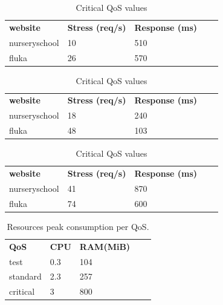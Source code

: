 \begin{table}[!htb]
\centering

\begin{tabular}{|l|ll|ll}
\cline{1-3}
\textbf{website} & \multicolumn{1}{l|}{\textbf{Stress (req/s)}} & \textbf{Response (ms)} &  &  \\ \cline{1-3}
nurseryschool    & 10                                           & 510                    &  &  \\ \cline{1-1}
fluka            & 26                                           & 570                    &  &  \\ \cline{1-3}
\end{tabular}
\caption{Test QoS Values}


\begin{tabular}{|l|ll|ll}
\cline{1-3}
\textbf{website} & \multicolumn{1}{l|}{\textbf{Stress (req/s)}} & \textbf{Response (ms)} &  &  \\ \cline{1-3}
nurseryschool    & 18                                           & 240                    &  &  \\ \cline{1-1}
fluka            & 48                                           & 103                    &  &  \\ \cline{1-3}
\end{tabular}
\hfill
\caption{Standard QoS values}
\begin{tabular}{|l|ll|ll}
\cline{1-3}
\textbf{website} & \multicolumn{1}{l|}{\textbf{Stress (req/s)}} & \textbf{Response (ms)} &  &  \\ \cline{1-3}
nurseryschool    & 41  & 870   &  &  \\ \cline{1-1}
fluka            & 74  & 600   &  &  \\ \cline{1-3}
\end{tabular}
\caption{Critical QoS values}
\end{table}


\begin{table}[]
\centering
\label{tabel_of_resources}
\begin{tabular}{|l|ll|ll}
\cline{1-3}
\textbf{QoS} & \multicolumn{1}{l|}{\textbf{CPU}} & \textbf{RAM(MiB)} &  &  \\ \cline{1-3}
test         & 0.3                                & 104               &  &  \\ \cline{1-1}
standard     & 2.3                                & 257               &  &  \\ \cline{1-1}
critical     & 3  & 800               &  &  \\ \cline{1-3}
\end{tabular}
\caption{ Resources peak consumption per QoS.}
\end{table}

